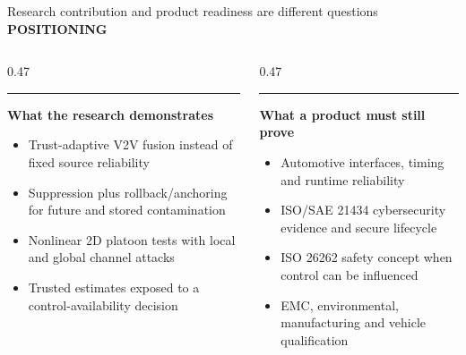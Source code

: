 \documentclass[aspectratio=169,11pt,xcolor=table]{beamer}
\newcommand{\eyebrow}[1]{%
  {\color{BrandCyan}\fontsize{7.5}{9}\selectfont\bfseries\MakeUppercase{#1}}\par\vspace{0.13cm}%
}
\begin{document}
\begin{frame}{Research contribution and product readiness are different questions}
  \eyebrow{Positioning}
  \begin{columns}[T,onlytextwidth]
    \begin{column}{0.47\textwidth}
      {\color{Good}\rule{\linewidth}{0.09cm}}\par
      \vspace{0.12cm}
      {\color{Good}\fontsize{12.5}{14.5}\selectfont\bfseries What the research demonstrates}\par
      \vspace{0.10cm}
      {\fontsize{8.6}{10.3}\selectfont
      \begin{itemize}
        \item Trust-adaptive V2V fusion instead of fixed source reliability
        \item Suppression plus rollback/anchoring for future and stored contamination
        \item Nonlinear 2D platoon tests with local and global channel attacks
        \item Trusted estimates exposed to a control-availability decision
      \end{itemize}}
    \end{column}
    \begin{column}{0.47\textwidth}
      {\color{Warn}\rule{\linewidth}{0.09cm}}\par
      \vspace{0.12cm}
      {\color{Warn}\fontsize{12.5}{14.5}\selectfont\bfseries What a product must still prove}\par
      \vspace{0.10cm}
      {\fontsize{8.6}{10.3}\selectfont
      \begin{itemize}
        \item Automotive interfaces, timing and runtime reliability
        \item ISO/SAE 21434 cybersecurity evidence and secure lifecycle
        \item ISO 26262 safety concept when control can be influenced
        \item EMC, environmental, manufacturing and vehicle qualification
      \end{itemize}}
    \end{column}
  \end{columns}
  \vspace{0.10cm}

\end{frame}
\end{document}
